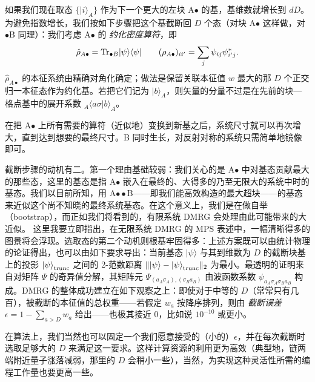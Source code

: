 \documentclass[a4paper,10pt,oneside,onecolumn,1p,times]{elsarticle}
\newcommand{\Tr}{{\rm Tr}}
\newcommand{\bra}[1]{\mbox{$\langle #1  |$}}
\newcommand{\ket}[1]{\mbox{$| #1  \rangle$}}
\newcommand{\braket}[2]{\mbox{$\langle #1  | #2 \rangle$}} 	%
\begin{document}
如果我们现在取态 $\{ \ket{i}_A \}$ 作为下一个更大的左块 A$\bullet$ 的基，基维数就增长到 $dD$。为避免指数增长，我们按如下步骤把这个基截断回 $D$ 个态（对块 A$\bullet$ 这样做，对 $\bullet$B 同理）：我们考虑 A$\bullet$ 的 {\em 约化密度算符}，即
\begin{equation}
\hat{\rho}_{A\bullet} = \Tr_{\bullet B} \ket{\psi}\bra{\psi} 	\quad\quad (\rho_{A\bullet})_{ii'} = \sum_j \psi_{ij}\psi^*_{i'j} .
\end{equation}
$\hat{\rho}_{A\bullet}$ 的本征系统由精确对角化确定；做法是保留关联本征值 $w$ 最大的那 $D$ 个正交归一本征态作为约化基。若把它们记为 $\ket{b}_A$，则矢量的分量不过是在先前的块—格点基中的展开系数 $_A \braket{a \sigma}{b}_A$。

在把 A$\bullet$ 上所有需要的算符（近似地）变换到新基之后，系统尺寸就可以再次增大，直到达到想要的最终尺寸。B 同时生长，对反射对称的系统只需简单地镜像即可。

截断步骤的动机有二。第一个理由基础较弱：我们关心的是 A$\bullet$ 中对基态贡献最大的那些态，这里的基态是指 A$\bullet$ 嵌入在最终的、大得多的乃至无限大的系统中时的基态。我们以目前所知，用 A$\bullet\bullet$B——即我们能高效构造的最大超块——的基态来近似这个尚不知晓的最终系统基态。在这个意义上，我们是在做自举（bootstrap），而正如我们将看到的，有限系统 DMRG 会处理由此可能带来的大近似。
这里我要立即指出，在无限系统 DMRG 的 MPS 表述中，一幅清晰得多的图景将会浮现。选取态的第二个动机则根基牢固得多：上述方案既可以由统计物理的论证得出，也可以由如下要求导出：当前基态 $\ket{\psi}$ 与其到维数为 $D$ 的截断块基上的投影 $\ket{\psi}_{{\rm trunc}}$ 之间的 2-范数距离 $\| \ket{\psi} - \ket{\psi}_{{\rm trunc}} \|_2$ 为最小。最透明的证明来自对矩阵 $\Psi$ 的奇异值分解，其矩阵元 $\Psi_{(a_A \sigma_A), (\sigma_B a_B)}$ 由波函数系数 $\psi_{a_A \sigma_A\sigma_B a_B}$ 构成。DMRG 的整体成功建立在如下观察之上：即使对于中等的 $D$（常常只有几百），被截断的本征值的总权重——若假定 $w_a$ 按降序排列，则由 {\em 截断误差} $\epsilon=1-\sum_{a>D} w_a$ 给出——也极其接近 0，比如说 $10^{-10}$ 或更小。

在算法上，我们当然也可以固定一个我们愿意接受的（小的）$\epsilon$，并在每次截断时选取足够大的 $D$ 来满足这一要求。这样计算资源的利用更为高效（典型地，链两端附近量子涨落减弱，那里的 $D$ 会稍小一些），当然，为实现这种灵活性所需的编程工作量也要更高一些。
\end{document}
